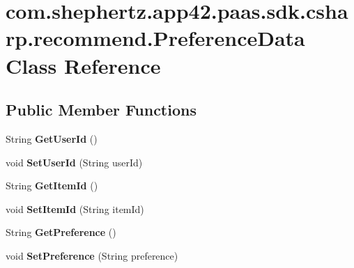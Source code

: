\hypertarget{classcom_1_1shephertz_1_1app42_1_1paas_1_1sdk_1_1csharp_1_1recommend_1_1_preference_data}{\section{com.\+shephertz.\+app42.\+paas.\+sdk.\+csharp.\+recommend.\+Preference\+Data Class Reference}
\label{classcom_1_1shephertz_1_1app42_1_1paas_1_1sdk_1_1csharp_1_1recommend_1_1_preference_data}
}
\subsection*{Public Member Functions}
\begin{DoxyCompactItemize}
\item 
\hypertarget{classcom_1_1shephertz_1_1app42_1_1paas_1_1sdk_1_1csharp_1_1recommend_1_1_preference_data_a924b6ee1a03f023454a3dad67173de8f}{String {\bfseries Get\+User\+Id} ()}\label{classcom_1_1shephertz_1_1app42_1_1paas_1_1sdk_1_1csharp_1_1recommend_1_1_preference_data_a924b6ee1a03f023454a3dad67173de8f}

\item 
\hypertarget{classcom_1_1shephertz_1_1app42_1_1paas_1_1sdk_1_1csharp_1_1recommend_1_1_preference_data_a5ebde2c6e40dfcc04fd5d6f7dc858928}{void {\bfseries Set\+User\+Id} (String user\+Id)}\label{classcom_1_1shephertz_1_1app42_1_1paas_1_1sdk_1_1csharp_1_1recommend_1_1_preference_data_a5ebde2c6e40dfcc04fd5d6f7dc858928}

\item 
\hypertarget{classcom_1_1shephertz_1_1app42_1_1paas_1_1sdk_1_1csharp_1_1recommend_1_1_preference_data_a722ea7e41ced77eaf9c33d7b89b70e7f}{String {\bfseries Get\+Item\+Id} ()}\label{classcom_1_1shephertz_1_1app42_1_1paas_1_1sdk_1_1csharp_1_1recommend_1_1_preference_data_a722ea7e41ced77eaf9c33d7b89b70e7f}

\item 
\hypertarget{classcom_1_1shephertz_1_1app42_1_1paas_1_1sdk_1_1csharp_1_1recommend_1_1_preference_data_a8d5b623dd49c1828b06305a0646c6bf3}{void {\bfseries Set\+Item\+Id} (String item\+Id)}\label{classcom_1_1shephertz_1_1app42_1_1paas_1_1sdk_1_1csharp_1_1recommend_1_1_preference_data_a8d5b623dd49c1828b06305a0646c6bf3}

\item 
\hypertarget{classcom_1_1shephertz_1_1app42_1_1paas_1_1sdk_1_1csharp_1_1recommend_1_1_preference_data_abe7190ff8856414f6a038f4054611ae7}{String {\bfseries Get\+Preference} ()}\label{classcom_1_1shephertz_1_1app42_1_1paas_1_1sdk_1_1csharp_1_1recommend_1_1_preference_data_abe7190ff8856414f6a038f4054611ae7}

\item 
\hypertarget{classcom_1_1shephertz_1_1app42_1_1paas_1_1sdk_1_1csharp_1_1recommend_1_1_preference_data_aafc9f049101aad21d7c333c142adcd46}{void {\bfseries Set\+Preference} (String preference)}\label{classcom_1_1shephertz_1_1app42_1_1paas_1_1sdk_1_1csharp_1_1recommend_1_1_preference_data_aafc9f049101aad21d7c333c142adcd46}

\end{DoxyCompactItemize}
